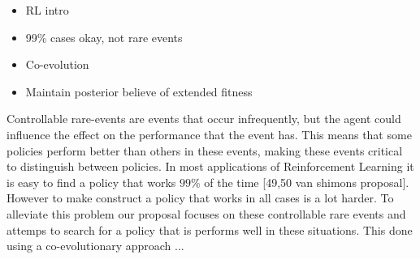 

\begin{itemize}
  \item{RL intro}
  \item{99\% cases okay, not rare events}
  \item{Co-evolution}
  \item{Maintain posterior believe of extended fitness}
\end{itemize}

Controllable rare-events are events that occur infrequently, but the agent could influence the effect on the performance that the event has. This means that some policies perform better than others in these events, making these events critical to distinguish between policies. In most applications of Reinforcement Learning it is easy to find a policy that works $99\%$ of the time [49,50 van shimons proposal]. However to make construct a policy that works in all cases is a lot harder. To alleviate this problem our proposal focuses on these controllable rare events and attemps to search for a policy that is performs well in these situations. This done using a co-evolutionary approach ...
